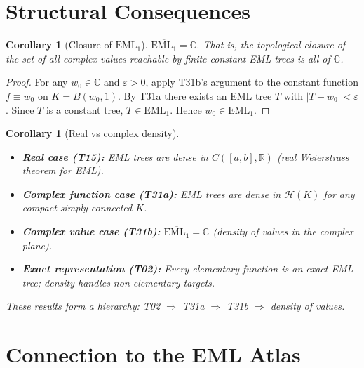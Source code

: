 \documentclass[11pt]{article}
\newtheorem{corollary}[theorem]{Corollary}
\begin{document}
\section{Structural Consequences}

\begin{corollary}[Closure of $\mathrm{EML}_1$]
$\overline{\mathrm{EML}_1} = \mathbb{C}$.  That is, the topological closure of
the set of all complex values reachable by finite constant EML trees is all of
$\mathbb{C}$.
\end{corollary}

\begin{proof}
For any $w_0 \in \mathbb{C}$ and $\varepsilon > 0$, apply T31b's argument to
the constant function $f \equiv w_0$ on $K = \bar{B}(w_0, 1)$.  By T31a there
exists an EML tree $T$ with $|T - w_0| < \varepsilon$.  Since $T$ is a constant
tree, $T \in \mathrm{EML}_1$.  Hence $w_0 \in \overline{\mathrm{EML}_1}$.
\end{proof}

\begin{corollary}[Real vs complex density]
\leavevmode
\begin{itemize}
\item \textbf{Real case (T15):} EML trees are dense in $C([a,b],\mathbb{R})$
  (real Weierstrass theorem for EML).
\item \textbf{Complex function case (T31a):} EML trees are dense in
  $\mathcal{H}(K)$ for any compact simply-connected $K$.
\item \textbf{Complex value case (T31b):} $\overline{\mathrm{EML}_1} = \mathbb{C}$
  (density of values in the complex plane).
\item \textbf{Exact representation (T02):} Every elementary function is an exact
  EML tree; density handles non-elementary targets.
\end{itemize}
These results form a hierarchy: T02 $\Rightarrow$ T31a $\Rightarrow$ T31b
$\Rightarrow$ density of values.
\end{corollary}

\section{Connection to the EML Atlas}
\end{document}
